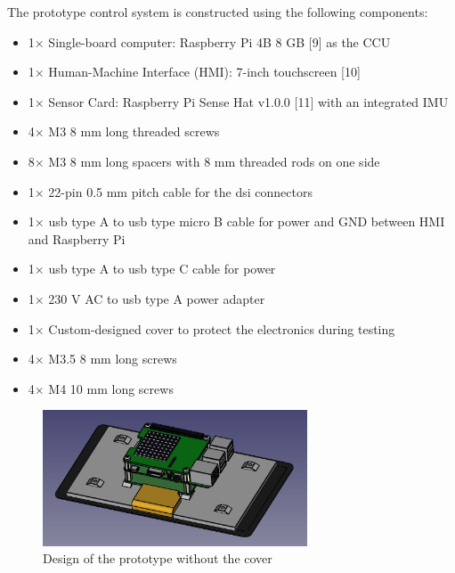 \documentclass[../main.tex]{subfiles}
\begin{document}
    The prototype control system is constructed using the following components:

    \begin{itemize}
        \item 1$\times$ Single-board computer: Raspberry Pi 4B 8 GB [9] as the CCU
        \item 1$\times$ Human-Machine Interface (HMI): 7-inch touchscreen [10]
        \item 1$\times$ Sensor Card: Raspberry Pi Sense Hat v1.0.0 [11] with an integrated IMU
        \item 4$\times$ M3 8 mm long threaded screws
        \item 8$\times$ M3 8 mm long spacers with 8 mm threaded rods on one side
        \item 1$\times$ 22-pin 0.5 mm pitch cable for the \gls{dsi} connectors
        \item 1$\times$ \gls{usb} type A to \gls{usb} type micro B cable for power and GND between HMI and Raspberry Pi
        \item 1$\times$ \gls{usb} type A to \gls{usb} type C cable for power
        \item 1$\times$ 230 V AC to \gls{usb} type A power adapter
        \item 1$\times$ Custom-designed cover to protect the electronics during testing
        \item 4$\times$ M3.5 8 mm long screws
        \item 4$\times$ M4 10 mm long screws
    \end{itemize}

    \begin{figure}[htbp!]
        \centering
        \includegraphics[width=0.7\textwidth]{resources/images/rpi_without_cover.png}
        \caption{Design of the prototype without the cover}
        \label{fig:prototype_graphics_without_cover}
    \end{figure}

    \clearpage
\end{document}
